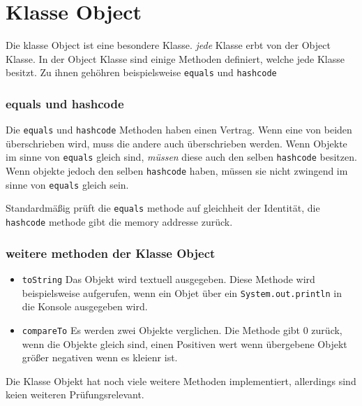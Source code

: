 \chapter{Klasse Object}
\label{chap:Klasse Object}

Die klasse Object ist eine besondere Klasse. \textit{jede} Klasse erbt von der Object Klasse. In der Object Klasse sind einige Methoden definiert, welche jede Klasse besitzt. Zu ihnen gehöhren beispielsweise \lstinline{equals} und \lstinline{hashcode}

\subsection{equals und hashcode}

Die \lstinline{equals} und \lstinline{hashcode} Methoden haben einen Vertrag. Wenn eine von beiden überschrieben wird, muss die andere auch überschrieben werden.
Wenn Objekte im sinne von \lstinline{equals} gleich sind, \textit{müssen} diese auch den selben \lstinline{hashcode} besitzen. Wenn objekte jedoch den selben \lstinline{hashcode} haben, müssen sie nicht zwingend im sinne von \lstinline{equals} gleich sein.

Standardmäßig prüft die \lstinline{equals} methode auf gleichheit der Identität, die \lstinline{hashcode} methode gibt die memory addresse zurück.

\subsection{weitere methoden der Klasse Object}

\begin{itemize}
    \item \lstinline{toString} Das Objekt wird textuell ausgegeben. Diese Methode wird beispielsweise aufgerufen, wenn ein Objet über ein \lstinline{System.out.println} in die Konsole ausgegeben wird.
    \item \lstinline{compareTo} Es werden zwei Objekte verglichen. Die Methode gibt 0 zurück, wenn die Objekte gleich sind, einen Positiven wert wenn übergebene Objekt größer negativen wenn es kleienr ist.
\end{itemize}

Die Klasse Objekt hat noch viele weitere Methoden implementiert, allerdings sind keien weiteren Prüfungsrelevant.